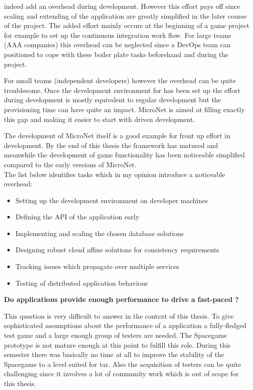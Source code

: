 \mssuc{} indeed  add an overhead during development. However this effort pays
off since scaling and extending of the application are greatly simplified in the
later course of the project. The added effort mainly occurs at the beginning of
a game project for example to set up the continuous integration work flow. For
large teams (AAA companies) this overhead can be neglected since a DevOps team
can positioned to cope with these boiler plate tasks beforehand and during the
project.

For small teams (independent developers) however the overhead can be quite
troublesome. Once the development environment for \ms{} has been set up the
effort during development is mostly equivalent to regular \og{} development but
the provisioning time can have quite an impact. MicroNet is aimed at filling
exactly this gap and making it easier to start with \ms{} driven \og{}
development.

The development of MicroNet itself is a good example for front up effort in
\ms{} development. By the end of this thesis the framework has matured and
meanwhile the development of game functionality has been noticeable simplified
compared to the early versions of MicroNet.\\

The list below identifies tasks which in my opinion introduce a noticeable
overhead:
\begin{itemize}
  \item Setting up the development environment on developer machines
  \item Defining the API of the application early
  \item Implementing and scaling the chosen database solutions
  \item Designing robust cloud affine solutions for consistency requirements
  \item Tracking issues which propagate over multiple services
  \item Testing of distributed application behaviour
\end{itemize}

\noindent \textbf{Do \ms{} applications provide enough performance to
drive a fast-paced \og{}?}

This question is very difficult to answer in the context of this thesis. To give
sophisticated assumptions about the performance of a \ms{} application a
fully-fledged test game and a large enough group of testers are needed. The
Spacegame prototype is not mature enough at this point to fulfill this role.
During this semester there was basically no time at all to improve the stability
of the Spacegame to a level suited for \gls{tar}. Also the acquisition of
testers can be quite challenging since it involves a lot of community work which
is out of scope for this thesis.

